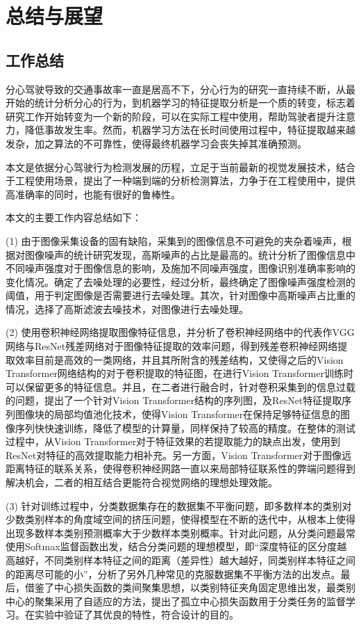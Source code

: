 \chapter{总结与展望}

\section{工作总结}

分心驾驶导致的交通事故率一直是居高不下，分心行为的研究一直持续不断，从最开始的统计分析分心的行为，到机器学习的特征提取分析是一个质的转变，标志着研究工作开始转变为一个新的阶段，可以在实际工程中使用，帮助驾驶者提升注意力，降低事故发生率。然而，机器学习方法在长时间使用过程中，特征提取越来越发杂，加之算法的不可靠性，使得最终机器学习会丧失掉其准确预测。

本文是依据分心驾驶行为检测发展的历程，立足于当前最新的视觉发展技术，结合于工程使用场景，提出了一种端到端的分析检测算法，力争于在工程使用中，提供高准确率的同时，也能有很好的鲁棒性。

本文的主要工作内容总结如下：

(1)	由于图像采集设备的固有缺陷，采集到的图像信息不可避免的夹杂着噪声，根据对图像噪声的统计研究发现，高斯噪声的占比是最高的。统计分析了图像信息中不同噪声强度对于图像信息的影响，及施加不同噪声强度，图像识别准确率影响的变化情况。确定了去噪处理的必要性，经过分析，最终确定了图像噪声强度检测的阈值，用于判定图像是否需要进行去噪处理。其次，针对图像中高斯噪声占比重的情况，选择了高斯滤波去噪技术，对图像进行去噪处理。

(2)	使用卷积神经网络提取图像特征信息，并分析了卷积神经网络中的代表作VGG网络与ResNet残差网络对于图像特征提取的效率问题，得到残差卷积神经网络提取效率目前是高效的一类网络，并且其所附含的残差结构，又使得之后的Vision Transformer网络结构的对于卷积提取的特征图，在进行Vision Transformer训练时可以保留更多的特征信息。并且，在二者进行融合时，针对卷积采集到的信息过载的问题，提出了一个针对Vision Transformer结构的序列图，及ResNet特征提取序列图像块的局部均值池化技术，使得Vision Transformer在保持足够特征信息的图像序列快快速训练，降低了模型的计算量，同样保持了较高的精度。在整体的测试过程中，从Vision Transformer对于特征效果的若提取能力的缺点出发，使用到ResNet对特征的高效提取能力相补充。另一方面，Vision Transformer对于图像远距离特征的联系关系，使得卷积神经网路一直以来局部特征联系性的弊端问题得到解决机会，二者的相互结合更能符合视觉网络的理想处理效能。

(3)	针对训练过程中，分类数据集存在的数据集不平衡问题，即多数样本的类别对少数类别样本的角度域空间的挤压问题，使得模型在不断的迭代中，从根本上使得出现多数样本类别预测概率大于少数样本类别概率。针对此问题，从分类问题最常使用Softmax监督函数出发，结合分类问题的理想模型，即“深度特征的区分度越高越好，不同类别样本特征之间的距离（差异性）越大越好，同类别样本特征之间的距离尽可能的小”，分析了另外几种常见的克服数据集不平衡方法的出发点。最后，借鉴了中心损失函数的类间聚集思想，以类别特征夹角固定思维出发，最类别中心的聚集采用了自适应的方法，提出了孤立中心损失函数用于分类任务的监督学习。在实验中验证了其优良的特性，符合设计的目的。

